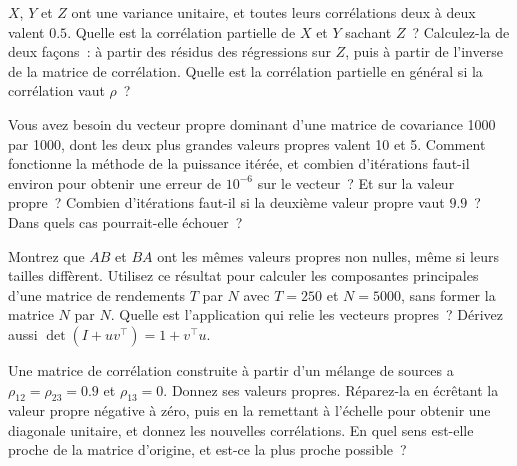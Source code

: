 \begin{question}\label{iq:iv1:linear-algebra:20}
$X$, $Y$ et $Z$ ont une variance unitaire, et toutes leurs corrélations deux à deux valent $0.5$. Quelle est la corrélation partielle de $X$ et $Y$ sachant $Z$~? Calculez-la de deux façons~: à partir des résidus des régressions sur $Z$, puis à partir de l'inverse de la matrice de corrélation. Quelle est la corrélation partielle en général si la corrélation vaut $\rho$~?
\end{question}

\begin{question}\label{iq:iv1:linear-algebra:21}
Vous avez besoin du vecteur propre dominant d'une matrice de covariance 1000 par 1000, dont les deux plus grandes valeurs propres valent 10 et 5. Comment fonctionne la méthode de la puissance itérée, et combien d'itérations faut-il environ pour obtenir une erreur de $10^{-6}$ sur le vecteur~? Et sur la valeur propre~? Combien d'itérations faut-il si la deuxième valeur propre vaut $9.9$~? Dans quels cas pourrait-elle échouer~?
\end{question}

\begin{question}\label{iq:iv1:linear-algebra:22}
Montrez que $AB$ et $BA$ ont les mêmes valeurs propres non nulles, même si leurs tailles diffèrent. Utilisez ce résultat pour calculer les composantes principales d'une matrice de rendements $T$ par $N$ avec $T = 250$ et $N = 5000$, sans former la matrice $N$ par $N$. Quelle est l'application qui relie les vecteurs propres~? Dérivez aussi $\det(I + uv^\top) = 1 + v^\top u$.
\end{question}

\begin{question}\label{iq:iv1:linear-algebra:23}
Une matrice de corrélation construite à partir d'un mélange de sources a $\rho_{12} = \rho_{23} = 0.9$ et $\rho_{13} = 0$. Donnez ses valeurs propres. Réparez-la en écrêtant la valeur propre négative à zéro, puis en la remettant à l'échelle pour obtenir une diagonale unitaire, et donnez les nouvelles corrélations. En quel sens est-elle proche de la matrice d'origine, et est-ce la plus proche possible~?
\end{question}

